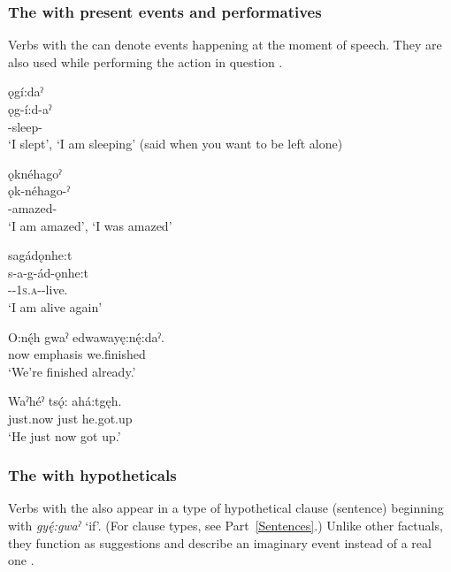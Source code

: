 \subsubsection*{The  {\factual} with present events and performatives} \label{The [aˀ-] factual with present events and performatives}
Verbs with the  {\factual} can denote events happening at the moment of speech. They are also used while performing the action in question .

\ea\label{ex:moodex15}

\ea ǫgí:daˀ \\
\gll ǫg-í:d-aˀ\\
-sleep-{\punctual}\\
\glt ‘I slept’, `I am sleeping' (said when you want to be left alone)

\ex ǫknéhagoˀ \\
\gll ǫk-néhago-ˀ\\
-amazed-{\punctual}\\
\glt ‘I am amazed’, `I was amazed'

\ex sagádǫnhe:t\\
\gll s-a-g-ád-ǫnhe:t\\
{\repetitive}-{\factual}-\textsc{1s.a}-{\semireflexive}-live.{\zeropunctual}\\
\glt `I am alive again'

\ex
\gll O:nę́h gwaˀ edwawayę:nę́:daˀ. \\
now emphasis we.finished\\
\glt ‘We’re finished already.’	

\ex
\gll Waˀhéˀ tsǫ́: ahá:tgęh.\\
just.now just he.got.up \\
\glt ‘He just now got up.’ 
\z
\z


\subsubsection*{The  {\factual} with hypotheticals} \label{The [aˀ-] factual with hypotheticals}
Verbs with the  {\factual} also appear in a type of hypothetical clause (sentence) beginning with \textit{gyę́:gwaˀ} ‘if’. (For clause types, see Part~\ref{Sentences}.) Unlike other factuals, they function as suggestions and describe an imaginary event instead of a real one .

